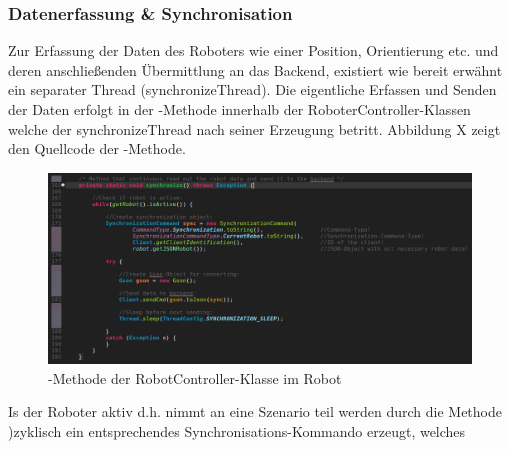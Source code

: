 \subsubsection{Datenerfassung \& Synchronisation}
Zur Erfassung der Daten des Roboters wie einer Position, Orientierung etc. und deren anschließenden Übermittlung an das Backend, 
existiert wie bereit erwähnt ein separater Thread (synchronizeThread). Die eigentliche Erfassen und Senden der Daten erfolgt in der 
-Methode innerhalb der RoboterController-Klassen welche der synchronizeThread nach seiner Erzeugung betritt.
Abbildung X zeigt den Quellcode der -Methode.
\begin{figure}[ht]
	\centering
	\includegraphics[width=1.0\textwidth]{images/implementation/synchronizeMethod.png}
	\caption[-Methode der RobotController-Klasse im Robot]{-Methode der RobotController-Klasse im Robot}
\end{figure}
\newline
Is der Roboter aktiv d.h. nimmt an eine Szenario teil werden durch die Methode )zyklisch ein entsprechendes Synchronisations-Kommando erzeugt, welches
